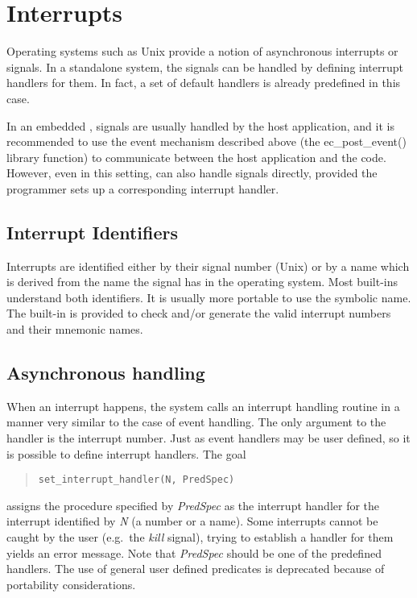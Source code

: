 \section{Interrupts}
\label{sectinterrupts}
Operating systems such as Unix provide a notion of asynchronous interrupts
or signals. In a standalone {\eclipse} system, the signals can be handled by
defining interrupt handlers for them. In fact, a set of
default handlers is already predefined in this case.

In an embedded {\eclipse}, signals are usually handled by the host
application, and it is recommended to use the event mechanism described above
(the ec_post_event() library function) to communicate between the host
application and the {\eclipse} code.
However, even in this setting, {\eclipse} can also handle signals directly,
provided the programmer sets up a corresponding interrupt handler.


\subsection{Interrupt Identifiers}
Interrupts are identified either by their signal number (Unix) or
by a name which is derived from the name the signal has in the operating
system. Most built-ins understand both identifiers. It is usually
more portable to use the symbolic name.
The built-in  is provided to check and/or
generate the valid interrupt numbers and their mnemonic names.


\subsection{Asynchronous handling}

When an interrupt happens, the {\eclipse} system
calls an interrupt handling routine in a manner very similar to
the case of event handling. The only argument to the handler is
the interrupt number.
Just as event handlers may be user defined, so it is possible to define
interrupt handlers. The goal
\begin{quote}
\begin{verbatim}
set_interrupt_handler(N, PredSpec)
\end{verbatim}
\end{quote}
assigns the procedure specified by {\it PredSpec} as the interrupt handler for
the interrupt identified by {\it N} (a number or a name).
Some interrupts cannot be caught by the user (e.g.\ the {\it kill} signal),
trying to establish a handler for them yields an error message. Note that
{\it PredSpec} should be one of the predefined handlers. The use of general
user defined predicates is deprecated because of portability considerations.

